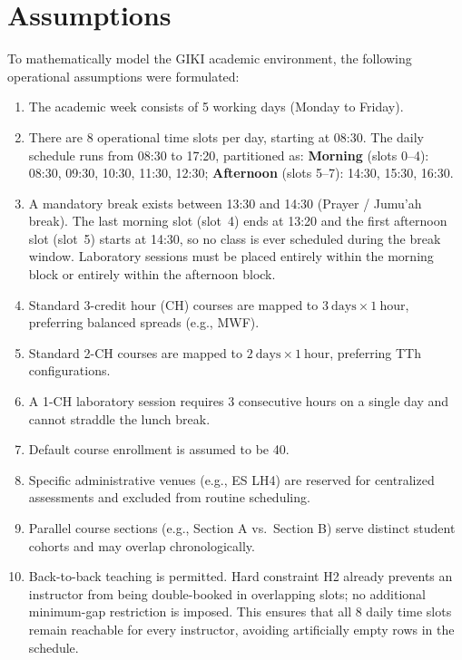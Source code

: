 \documentclass[12pt, a4paper]{article}
\begin{document}
\section{Assumptions}

To mathematically model the GIKI academic environment, the following operational
assumptions were formulated:

\begin{enumerate}[label=\arabic*., noitemsep, topsep=4pt]
    \item The academic week consists of 5 working days (Monday to Friday).

    \item There are 8 operational time slots per day, starting at 08:30.
          The daily schedule runs from 08:30 to 17:20, partitioned as:
          \textbf{Morning} (slots 0--4): 08:30, 09:30, 10:30, 11:30, 12:30;
          \textbf{Afternoon} (slots 5--7): 14:30, 15:30, 16:30.

    \item A mandatory break exists between 13:30 and 14:30 (Prayer /
          Jumu'ah break). The last morning slot (slot~4) ends at 13:20 and
          the first afternoon slot (slot~5) starts at 14:30, so no class
          is ever scheduled during the break window.
          Laboratory sessions must be placed entirely within the morning
          block or entirely within the afternoon block.

    \item Standard 3-credit hour (CH) courses are mapped to
          $3\ \text{days} \times 1\ \text{hour}$, preferring balanced spreads
          (e.g., MWF).

    \item Standard 2-CH courses are mapped to
          $2\ \text{days} \times 1\ \text{hour}$, preferring TTh configurations.

    \item A 1-CH laboratory session requires 3 consecutive hours on a single day and
          cannot straddle the lunch break.

    \item Default course enrollment is assumed to be 40.

    \item Specific administrative venues (e.g., ES LH4) are reserved for centralized
          assessments and excluded from routine scheduling.

    \item Parallel course sections (e.g., Section A vs.\ Section B) serve distinct
          student cohorts and may overlap chronologically.

    \item Back-to-back teaching is permitted. Hard constraint H2 already
          prevents an instructor from being double-booked in overlapping
          slots; no additional minimum-gap restriction is imposed. This
          ensures that all 8 daily time slots remain reachable for every
          instructor, avoiding artificially empty rows in the schedule.
\end{enumerate}
\end{document}
